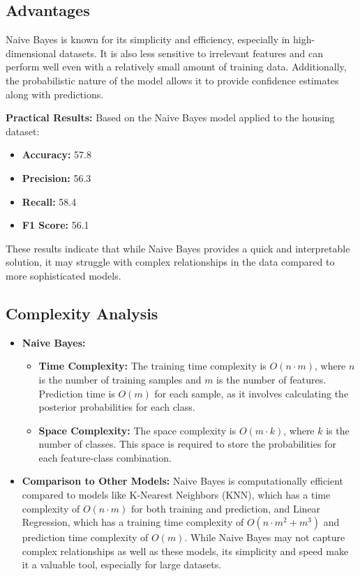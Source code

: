 \documentclass[10pt,conference,compsoc]{IEEEtran}
\begin{document}
{\subsection{Advantages}
Naive Bayes is known for its simplicity and efficiency, especially in high-dimensional datasets. It is also less sensitive to irrelevant features and can perform well even with a relatively small amount of training data. Additionally, the probabilistic nature of the model allows it to provide confidence estimates along with predictions.

\textbf{Practical Results:}
Based on the Naive Bayes model applied to the housing dataset:
\begin{itemize}
    \item \textbf{Accuracy:} 57.8%
    \item \textbf{Precision:} 56.3%
    \item \textbf{Recall:} 58.4%
    \item \textbf{F1 Score:} 56.1%
\end{itemize}
These results indicate that while Naive Bayes provides a quick and interpretable solution, it may struggle with complex relationships in the data compared to more sophisticated models.

\subsection{Complexity Analysis}
\begin{itemize}
    \item \textbf{Naive Bayes:}
    \begin{itemize}
        \item \textbf{Time Complexity:} The training time complexity is \( O(n \cdot m) \), where \( n \) is the number of training samples and \( m \) is the number of features. Prediction time is \( O(m) \) for each sample, as it involves calculating the posterior probabilities for each class.
        \item \textbf{Space Complexity:} The space complexity is \( O(m \cdot k) \), where \( k \) is the number of classes. This space is required to store the probabilities for each feature-class combination.
    \end{itemize}
    \item \textbf{Comparison to Other Models:} Naive Bayes is computationally efficient compared to models like K-Nearest Neighbors (KNN), which has a time complexity of \( O(n \cdot m) \) for both training and prediction, and Linear Regression, which has a training time complexity of \( O(n \cdot m^2 + m^3) \) and prediction time complexity of \( O(m) \). While Naive Bayes may not capture complex relationships as well as these models, its simplicity and speed make it a valuable tool, especially for large datasets.
\end{itemize}


}
\end{document}
